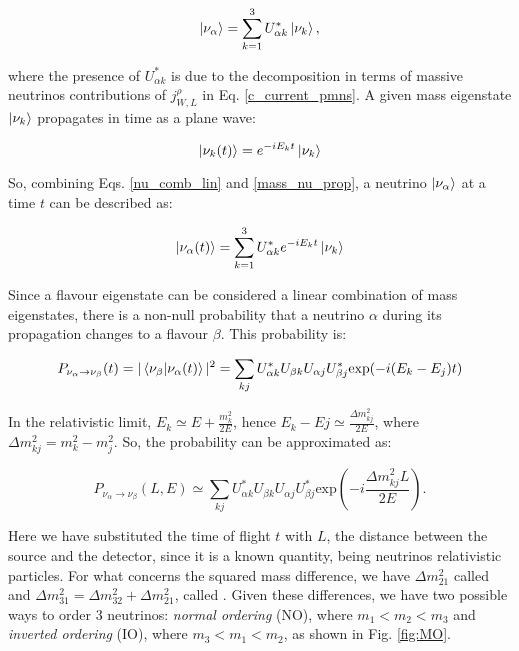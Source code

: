 \begin{equation}
\label{nu_comb_lin}
    \ket{\nu_\alpha} = \sum_{k=1}^3 U^*_{\alpha k} \ket{\nu_k},
\end{equation}

where the presence of $U^*_{\alpha k}$ is due to the decomposition in terms of massive neutrinos contributions of $j^\rho_{W,L}$ in Eq. \ref{c_current_pmns}. 
A given mass eigenstate $\ket{\nu_k}$ propagates in time as a plane wave: 

\begin{equation}
\label{mass_nu_prop}
    \ket{\nu_k(t)} = e^{-iE_kt}\ket{\nu_k}
\end{equation}

So, combining Eqs. \ref{nu_comb_lin} and \ref{mass_nu_prop}, a neutrino $\ket{\nu_\alpha}$ at a time $t$ can be described as: 

\begin{equation}
    \ket{\nu_\alpha(t)} = \sum_{k=1}^3 U^*_{\alpha k} e^{-iE_kt}\ket{\nu_k}
\end{equation}

Since a flavour eigenstate can be considered a linear combination of mass eigenstates, there is a non-null probability that a neutrino $\alpha$ during its propagation changes to a flavour $\beta$. This probability is: 

\begin{equation}
    P_{\nu_{\alpha} \rightarrow \nu_{\beta}}(t) = |\braket{\nu_\beta|\nu_\alpha (t)}|^2 = \sum_{kj} U^*_{\alpha k}U_{\beta k}U_{\alpha j}U^*_{\beta j} \text{exp}({-i(E_k - E_j)t})
\end{equation}

In the relativistic limit, $E_k \simeq E + \frac{m^2_k}{2E}$, hence $E_k - Ej \simeq \frac{\Delta m^2_{kj}}{2E}$, where $\Delta m^2_{kj} = m^2_k - m^2_j$.  So, the probability can be approximated as: 

\begin{equation}
    P_{\nu_{\alpha} \rightarrow \nu_{\beta}}(L,E) \simeq \sum_{kj} U^*_{\alpha k}U_{\beta k}U_{\alpha j}U^*_{\beta j} \text{exp}\left(-i\frac{\Delta m^2_{kj} L}{2E}\right).
\end{equation}

Here we have substituted the time of flight $t$ with $L$, the distance between the source and the detector, since it is a known quantity, being neutrinos relativistic particles.
For what concerns the squared mass difference, we have $\Delta m^2_{21}$ called  and $\Delta m^2_{31} = \Delta m^2_{32} + \Delta m^2_{21}$, called . Given these differences, we have two possible ways to order 3 neutrinos: \textit{normal ordering} (NO), where $m_1 < m_2 < m_3$ and \textit{inverted ordering} (IO), where $m_3 < m_1 < m_2$, as shown in Fig. \ref{fig:MO}.

